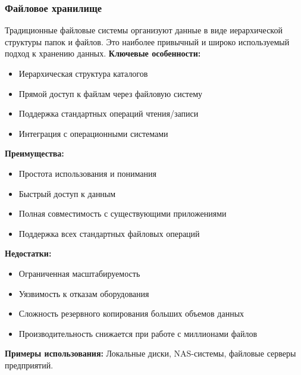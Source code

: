 \subsubsection*{Файловое хранилище}
Традиционные файловые системы организуют данные в виде иерархической структуры папок и файлов. Это наиболее привычный и широко используемый подход к хранению данных.
\textbf{Ключевые особенности:}
\begin{itemize}
\item Иерархическая структура каталогов
\item Прямой доступ к файлам через файловую систему
\item Поддержка стандартных операций чтения/записи
\item Интеграция с операционными системами
\end{itemize}
\textbf{Преимущества:}
\begin{itemize}
\item Простота использования и понимания
\item Быстрый доступ к данным
\item Полная совместимость с существующими приложениями
\item Поддержка всех стандартных файловых операций
\end{itemize}
\textbf{Недостатки:}
\begin{itemize}
\item Ограниченная масштабируемость
\item Уязвимость к отказам оборудования
\item Сложность резервного копирования больших объемов данных
\item Производительность снижается при работе с миллионами файлов
\end{itemize}
\textbf{Примеры использования:} Локальные диски, NAS-системы, файловые серверы предприятий.
